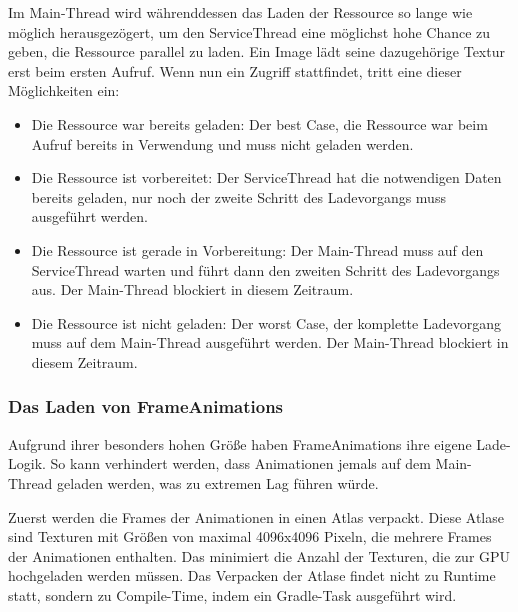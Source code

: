 Im Main-Thread wird währenddessen das Laden der Ressource so lange wie möglich herausgezögert, um den ServiceThread
eine möglichst hohe Chance zu geben, die Ressource parallel zu laden.
Ein Image \zB lädt seine dazugehörige Textur erst beim ersten  Aufruf.
Wenn nun ein Zugriff stattfindet, tritt eine dieser Möglichkeiten ein:

\begin{itemize}
    \item Die Ressource war bereits geladen: Der best Case, die Ressource war beim  Aufruf bereits
        in Verwendung und muss nicht geladen werden.
    \item Die Ressource ist vorbereitet: Der ServiceThread hat die notwendigen Daten bereits geladen, nur noch der
        zweite Schritt des Ladevorgangs muss ausgeführt werden.
    \item Die Ressource ist gerade in Vorbereitung: Der Main-Thread muss auf den ServiceThread warten und führt dann
        den zweiten Schritt des Ladevorgangs aus.
        Der Main-Thread blockiert in diesem Zeitraum.
    \item Die Ressource ist nicht geladen: Der worst Case, der komplette Ladevorgang muss auf dem Main-Thread ausgeführt
        werden.
        Der Main-Thread blockiert in diesem Zeitraum.
\end{itemize}

\subsubsection{Das Laden von FrameAnimations}

Aufgrund ihrer besonders hohen Größe haben FrameAnimations ihre eigene Lade-Logik.
So kann verhindert werden, dass Animationen jemals auf dem Main-Thread geladen werden, was zu extremen Lag führen würde.

Zuerst werden die Frames der Animationen in einen Atlas verpackt.
Diese Atlase sind Texturen mit Größen von maximal 4096x4096 Pixeln, die mehrere Frames der Animationen enthalten.
Das minimiert die Anzahl der Texturen, die zur GPU hochgeladen werden müssen.
Das Verpacken der Atlase findet nicht zu Runtime statt, sondern zu Compile-Time, indem ein Gradle-Task ausgeführt wird.

